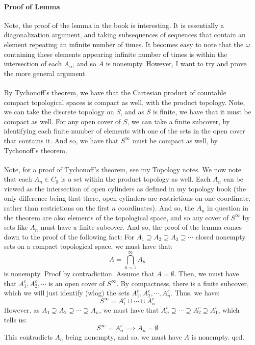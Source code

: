\documentclass[12pt,a4paper]{article}
\newcommand{\1}[1]{\mathbbm{1}\left\{ #1 \right\}}
\begin{document}
\paragraph{Proof of Lemma} Note, the proof of the lemma in the book is interesting. It is essentially a diagonalization argument, and taking subsequences of sequences that contain an element repeating an infinite number of times. It becomes easy to note that the $\omega$ containing these elements appearing infinite number of times is within the intersection of each $A_n$, and so $A$ is nonempty. However, I want to try and prove the more general argument.
\\\\
By Tychonoff's theorem, we have that the Cartesian product of countable compact topological spaces is compact as well, with the product topology. Note, we can take the discrete topology on $S$, and as $S$ is finite, we have that it must be compact as well. For any open cover of $S$, we can take a finite subcover, by identifying each finite number of elements with one of the sets in the open cover that contains it. And so, we have that $S^\infty$ must be compact as well, by Tychonoff's theorem.
\\\\
Note, for a proof of Tychonoff's theorem, see my Topology notes. We now note that each $A_n \in C_0$ is a set within the product topology as well. Each $A_n$ can be viewed as the intersection of open cylinders as defined in my topology book (the only difference being that there, open cylinders are restrictions on one coordinate, rather than restrictions on the first $n$ coordinates). And so, the $A_n$ in question in the theorem are also elements of the topological space, and so any cover of $S^\infty$ by sets like $A_n$ must have a finite subcover. And so, the proof of the lemma comes down to the proof of the following fact: For $A_1 \supseteq A_2 \supseteq A_3 \supseteq \cdots$ closed nonempty sets on a compact topological space, we must have that:
$$
	A = \bigcap_{n=1}^\infty A_n
$$
is nonempty. Proof by contradiction. Assume that $A = \emptyset$. Then, we must have that $A_1^c, A_2^c, \cdots$ is an open cover of $S^\infty$. By compactness, there is a finite subcover, which we will just identify (wlog) the sets $A_1^c, A_2^c, \cdots, A_n^c$. Thus, we have:
$$
	S^\infty = A_1^c \cup \cdots \cup A_n^c
$$
However, as $A_1 \supseteq A_2 \supseteq \cdots \supseteq A_n$, we must have that $A_n^c \supseteq \cdots \supseteq A_2^c \supseteq A_1^c$, which tells us:
$$
	S^\infty = A_n^c \implies A_n = \emptyset
$$
This contradicts $A_n$ being nonempty, and so, we must have $A$ is nonempty. qed.
\end{document}
